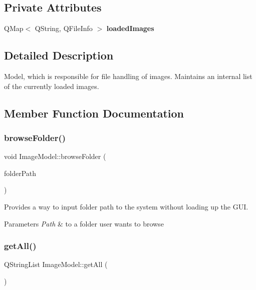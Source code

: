 \subsection*{Private Attributes}
\begin{DoxyCompactItemize}
\item 
\mbox{\label{classImageModel_a238323b509f2644dcd2858558a40448a}} 
Q\+Map$<$ Q\+String, Q\+File\+Info $>$ {\bfseries loaded\+Images}
\end{DoxyCompactItemize}


\subsection{Detailed Description}
Model, which is responsible for file handling of images. Maintains an internal list of the currently loaded images. 

\subsection{Member Function Documentation}
\mbox{\label{classImageModel_a4923192da890831266d2348ce54b2e45}} 
\subsubsection{\texorpdfstring{browse\+Folder()}{browseFolder()}}
{\footnotesize\ttfamily void Image\+Model\+::browse\+Folder (\begin{DoxyParamCaption}\item[{const Q\+String \&}]{folder\+Path }\end{DoxyParamCaption})}



Provides a way to input folder path to the system without loading up the G\+UI. 


\begin{DoxyParams}{Parameters}
{\em Path} & to a folder user wants to browse \\
\hline
\end{DoxyParams}
\mbox{\label{classImageModel_a498623ffa9423fd249c62467c01edeee}} 
\subsubsection{\texorpdfstring{get\+All()}{getAll()}}
{\footnotesize\ttfamily Q\+String\+List Image\+Model\+::get\+All (\begin{DoxyParamCaption}{ }\end{DoxyParamCaption})}




